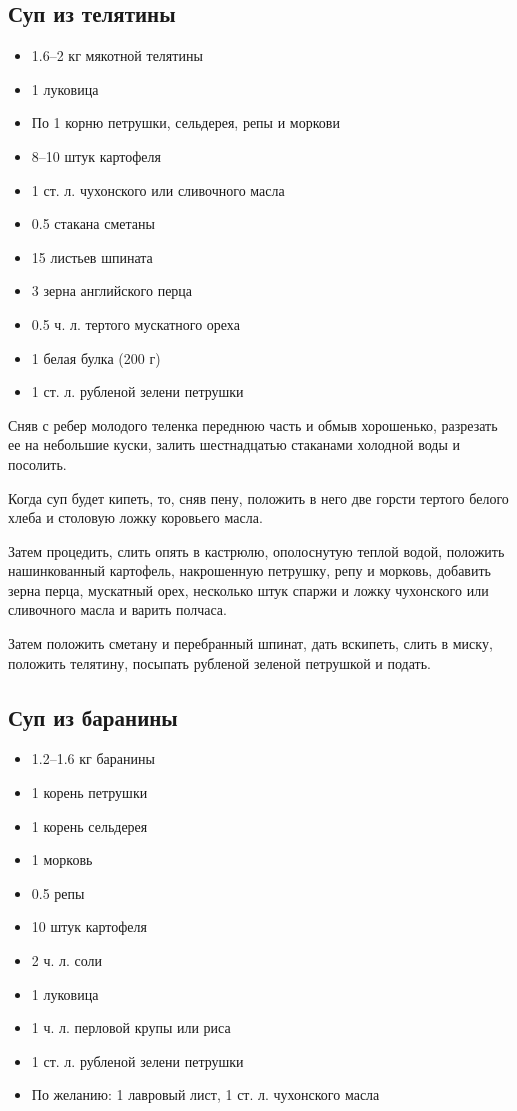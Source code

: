 \subsection{Суп из телятины}\label{20sup-teliatina}

\begin{itemize}
	\item 1.6–2 кг мякотной телятины 
	\item 1 луковица 
	\item По 1 корню петрушки, сельдерея, репы и моркови 
	\item 8–10 штук картофеля 
	\item 1 ст. л. чухонского или сливочного масла 
	\item 0.5 стакана сметаны 
	\item 15 листьев шпината 
	\item 3 зерна английского перца 
	\item 0.5 ч. л. тертого мускатного ореха 
	\item 1 белая булка (200 г) 
	\item 1 ст. л. рубленой зелени петрушки
\end{itemize}

Сняв с ребер молодого теленка переднюю часть и обмыв хорошенько, разрезать ее на небольшие куски, залить шестнадцатью стаканами холодной воды и посолить.

Когда суп будет кипеть, то, сняв пену, положить в него две горсти тертого белого хлеба и столовую ложку коровьего масла.

Затем процедить, слить опять в кастрюлю, ополоснутую теплой водой, положить нашинкованный картофель, накрошенную петрушку, репу и морковь, добавить зерна перца, мускатный орех, несколько штук спаржи и ложку чухонского или сливочного масла и варить полчаса.

Затем положить сметану и перебранный шпинат, дать вскипеть, слить в миску, положить телятину, посыпать рубленой зеленой петрушкой и подать.

\subsection{Суп из баранины}\label{21sup-baran}

\begin{itemize}
	\item 1.2–1.6 кг баранины 
	\item 1 корень петрушки 
	\item 1 корень сельдерея 
	\item 1 морковь 
	\item 0.5 репы 
	\item 10 штук картофеля 
	\item 2 ч. л. соли 
	\item 1 луковица 
	\item 1 ч. л. перловой крупы или риса 
	\item 1 ст. л. рубленой зелени петрушки 
	\item По желанию: 1 лавровый лист, 1 ст. л. чухонского масла
\end{itemize}

